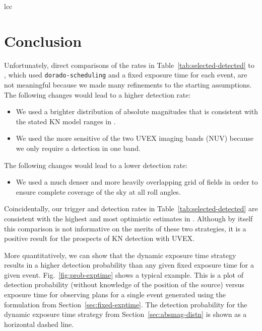 \documentclass[twocolumn,times]{aastex631}
\begin{document}
\begin{deluxetable}{lcc}
    \startdata
    
    \enddata
\end{deluxetable}

\section{Conclusion}

Unfortunately, direct comparisons of the rates in Table~\ref{tab:selected-detected} to \citet{criswell}, which used \texttt{dorado-scheduling} and a fixed exposure time for each event, are not meaningful because we made many refinements to the starting assumptions. The following changes would lead to a higher detection rate:
%
\begin{itemize}
    \item We used a brighter distribution of absolute magnitudes that is consistent with the stated \ac{KN} model ranges in \citet{2021arXiv211115608K}.
    \item We used the more sensitive of the two \ac{UVEX} imaging bands (\ac{NUV}) because we only require a detection in one band.
\end{itemize}
%
The following changes would lead to a lower detection rate:
%
\begin{itemize}
    \item We used a much denser and more heavily overlapping grid of fields in order to ensure complete coverage of the sky at all roll angles.
\end{itemize}
%
Coincidentally, our trigger and detection rates in Table~\ref{tab:selected-detected} are consistent with the highest and most optimistic estimates in \citet{criswell}. Although by itself this comparison is not informative on the merits of these two strategies, it is a positive result for the prospects of \ac{KN} detection with \ac{UVEX}.

More quantitatively, we can show that the dynamic exposure time strategy results in a higher detection probability than any given fixed exposure time for a given event. Fig.~\ref{fig:prob-exptime} shows a typical example. This is a plot of detection probability (without knowledge of the position of the source) versus exposure time for observing plans for a single event generated using the formulation from Section~\ref{sec:fixed-exptime}. The detection probability for the dynamic exposure time strategy from Section~\ref{sec:absmag-distn} is shown as a horizontal dashed line.
\end{document}
